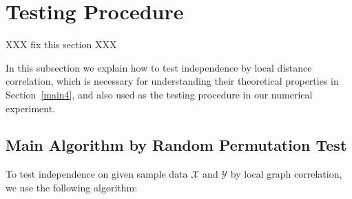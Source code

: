 \documentclass[11pt]{article}
\begin{document}
\section{Testing Procedure}
\label{main3}

XXX fix this section XXX

In this subsection we explain how to test independence by local distance correlation, which is necessary for understanding their theoretical properties in Section~\ref{main4}, and also used as the testing procedure in our numerical experiment.

\subsection{Main Algorithm by Random Permutation Test}

To test independence on given sample data $\mathcal{X}$ and $\mathcal{Y}$ by local graph correlation, we use the following algorithm:
\end{document}

